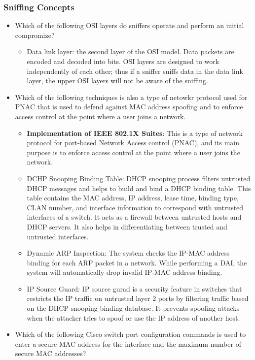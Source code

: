 \subsubsection{Sniffing Concepts}
\begin{itemize}
    \item Which of the following OSI layers do sniffers operate and perform an initial compromize?
    \begin{itemize}
        \item Data link layer: the second layer of the OSI model. Data packets are encoded and decoded into bits. OSI layers are designed to work independently of each other; thus if a sniffer sniffs data in the data link layer, the upper OSI layers will not be aware of the sniffing.
    \end{itemize}
    \item Which of the following techniques is also a type of netowkr protocol used for PNAC that is used to defend against MAC address spoofing and to enforce access control at the point where a user joins a network.
    \begin{itemize}
        \item \textbf{Implementation of IEEE 802.1X Suites}: This is a type of network protocol for port-based Network Access control (PNAC), and its main purpose is to enforce access control at the point where a user joins the network.
        \item DCHP Snooping Binding Table: DHCP snooping process filters untrusted DHCP messages and helps to build and bind a DHCP binding table. This table contains the MAC address, IP address, lease time, binding type, CLAN number, and interface information to correspond with untrusted interfaces of a switch. It acts as a firewall between untrusted hosts and DHCP servers. It also helps in differentiating between trusted and untrusted interfaces.
        \item Dynamic ARP Inspection: The system checks the IP-MAC address binding for each ARP packet in a network. While performing a DAI, the system will automatically drop invalid IP-MAC address binding.
        \item IP Source Guard: IP source gurad is a security feature in switches that restricts the IP traffic on untrusted layer 2 ports by filtering traffic based on the DHCP snooping binding database. It prevents spoofing attacks when the attacker tries to spoof or use the IP address of another host. 
    \end{itemize}
    \item Which of the following Cisco switch port configuration commands is used to enter a secure MAC address for the interface and the maximum number of secure MAC addresses?

\end{itemize}

